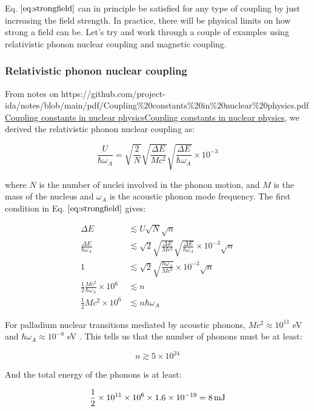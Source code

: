 \documentclass[
]{article}
\let\oldhref\href
\renewcommand{\href}[2]{\ifx#1\urlprefix\oldhref{#1}{#2}\else\uline{\oldhref{#1}{#2}}\fi}
\renewcommand{\[}{\begin{equation}}
\renewcommand{\]}{\end{equation}}
\begin{document}
Eq. \(\ref{eq:strongfield}\) can in principle be satisfied for any type
of coupling by just increasing the field strength. In practice, there
will be physical limits on how strong a field can be. Let's try and work
through a couple of examples using relativistic phonon nuclear coupling
and magnetic coupling.

\subsubsection{Relativistic phonon nuclear
coupling}\label{relativistic-phonon-nuclear-coupling}

From notes on
\href{https://github.com/project-ida/notes/blob/main/pdf/Coupling\%20constants\%20in\%20nuclear\%20physics.pdf}{Coupling
constants in nuclear physics}, we derived the relativistic phonon
nuclear coupling as:

\[
\frac{U}{\hbar \omega_A} = \sqrt{\frac{2}{N}} \sqrt{\frac{\Delta E}{M c^2}} \sqrt{\frac{\Delta E}{\hbar \omega_A}} \times 10^{-3}
\label{eq:phononcoupling}
\]

where \(N\) is the number of nuclei involved in the phonon motion, and
\(M\) is the mass of the nucleus and \(\omega_A\) is the acoustic phonon
mode frequency. The first condition in Eq. \(\ref{eq:strongfield}\)
gives:

\[
\begin{aligned}
\Delta E &\lesssim U\sqrt{N}\sqrt{n} \\
\frac{\Delta E}{\hbar \omega_A} &\lesssim \sqrt{2} \sqrt{\frac{\Delta E}{M c^2}} \sqrt{\frac{\Delta E}{\hbar \omega_A}} \times 10^{-3}\sqrt{n} \\
1 &\lesssim \sqrt{2} \sqrt{\frac{\hbar\omega_A}{M c^2}} \times 10^{-3}\sqrt{n} \\
\frac{1}{2}\frac{Mc^2}{\hbar\omega_A}\times 10^6 &\lesssim n \\
\frac{1}{2}Mc^2\times 10^6  &\lesssim n\hbar\omega_A
\end{aligned}
\label{eq:strongfieldconditiononn}
\]

For palladium nuclear transitions mediated by acoustic phonons,
\(M c^2 \approx 10^{11}\) eV and \(\hbar \omega_A \approx 10^{-8}\) eV .
This tells us that the number of phonons must be at least:

\[
n \gtrsim 5\times 10^{24}
\]

And the total energy of the phonons is at least:

\[
\frac{1}{2}\times 10^{11} \times 10^{6} \times 1.6\times 10^{-19} = 8 \, \rm mJ
\label{eq:minfieldenergy}
\]
\end{document}
